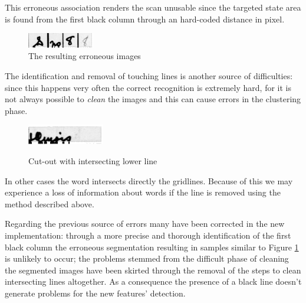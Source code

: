 This erroneous association renders the scan unusable since the targeted state area is found from the first black column through an hard-coded distance in pixel.

\begin{figure}[!htpb]
\centering
\includegraphics[width=0.26\textwidth]{images/wrongColumn.jpg}
\caption{The resulting erroneous images}
\label{err}
\end{figure} 

The identification and removal of touching lines is another source of difficulties: since this happens very often the correct recognition is extremely hard, for it is not always possible to \emph{clean} the images and this can cause errors in the clustering phase.


\begin{figure}[!htpb]
 \centering
 \includegraphics[width=0.3\textwidth]{images/img4.jpg}
 \label{postProcessing}
  \caption{Cut-out with intersecting lower line}
 
 \end{figure}
\hspace{1mm}

In other cases the word intersects directly the gridlines. Because of this we may experience a loss of information about words if the line is removed using the method described above.



Regarding the previous source of errors many have been corrected in the new implementation:
through a more precise and thorough identification of the first black column the erroneous segmentation resulting in samples similar to Figure \ref{err} is unlikely to occur; the problems stemmed from the difficult phase of cleaning the segmented images have been skirted through the removal of the steps to clean intersecting lines altogether. As a consequence the presence of a black line doesn't generate problems for the new features' detection.
